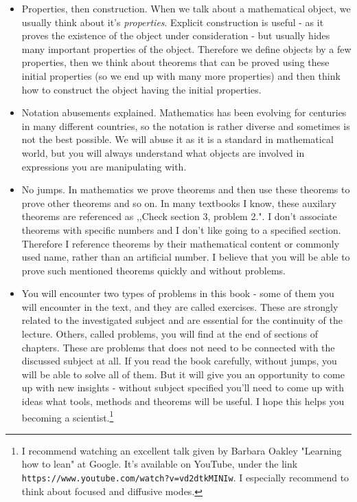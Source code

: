 \begin{itemize}
  \item Properties, then construction. When we talk about a mathematical object, we usually think about it's \textit{properties}. Explicit construction is useful - as it proves
    the existence of the object under consideration - but usually hides many important properties of the object. Therefore we define objects by a few properties, then we think about
    theorems that can be proved using these initial properties (so we end up with many more properties) and then think how to construct the object having the initial properties.
  \item Notation abusements explained. Mathematics has been evolving for centuries in many different countries, so the notation
    is rather diverse and sometimes is not the best possible. We will abuse it as it is a standard in mathematical world, but you will always understand
    what objects are involved in expressions you are manipulating with.
  \item No jumps. In mathematics we prove theorems and then use these theorems to prove other theorems and so on. In many textbooks I know, these auxilary theorems are referenced
    as ,,Check section 3, problem 2.". I don't associate theorems with specific numbers and I don't like going to a specified section. Therefore I reference theorems by their mathematical content or commonly used name, rather than an artificial number. I believe that you will be able to prove such
    mentioned theorems quickly and without problems.
  \item You will encounter two types of problems in this book - some of them you will encounter in the text, and they are called exercises. These are strongly related to the investigated subject and are essential for the continuity of the lecture. Others, called problems, you will find at the end of
  sections of chapters. These are problems that does not need to be connected with the discussed subject at all. If you read the book carefully, without jumps, you will be able to solve all of them. But it will give you an opportunity to come up with new insights - without subject specified you'll need to come up with ideas what tools, methods and theorems will be useful. I hope this helps you becoming a scientist.\footnote{I recommend watching an excellent talk given by Barbara Oakley "Learning how to lean" at Google. It's available on YouTube, under the link \texttt{https://www.youtube.com/watch?v=vd2dtkMINIw}. I especially recommend to think about focused and diffusive modes.}
\end{itemize}

